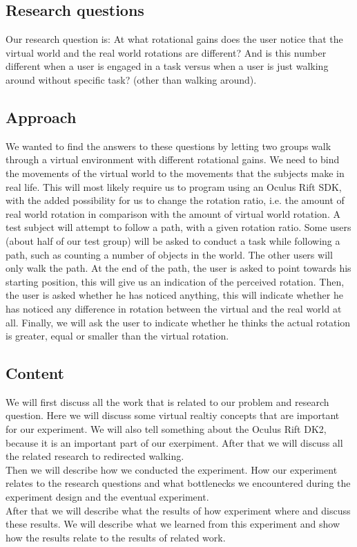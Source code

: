 \subsection{Research questions}\label{sec:questions}
Our research question is: At what rotational gains does the user notice that the virtual world and the real world rotations are different? And is this number different when a user is engaged in a task versus when a user is just walking around without specific task? (other than walking around).

\subsection{Approach}\label{sec:approach}
We wanted to find the answers to these questions by letting two groups walk through a virtual environment with different rotational gains. We need to bind the movements of the virtual world to the movements that the subjects make in real life.
This will most likely require us to program using an Oculus Rift SDK, with the added possibility for us to change the rotation ratio, i.e. the amount of real world rotation in comparison with the amount of virtual world rotation.
A test subject will attempt to follow a path, with a given rotation ratio.
Some users (about half of our test group) will be asked to conduct a task while following a path, such as counting a number of objects in the world. The other users will only walk the path. At the end of the path, the user is asked to point towards his starting position, this will give us an indication of the perceived rotation. Then, the user is asked whether he has noticed anything, this will indicate whether he has noticed any difference in rotation between the virtual and the real world at all. Finally, we will ask the user to indicate whether he thinks the actual rotation is greater, equal or smaller than the virtual rotation.

\subsection{Content}\label{sec:intro}
We will first discuss all the work that is related to our problem and research question. Here we will discuss some virtual realtiy concepts that are important for our experiment. We will also tell something about the Oculus Rift DK2, because it is an important part of our exerpiment. After that we will discuss all the related  research to redirected walking. \\
Then we will describe how we conducted the experiment. How our experiment relates to the research questions and  what bottlenecks we encountered during the experiment design and the eventual experiment. \\
After that we will describe what the results of how experiment where and discuss these results. We will describe what we learned from this experiment and show how the results relate to the results of related work. 
